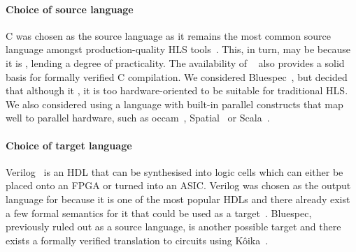 \paragraph{Choice of source language}
C was chosen as the source language as it remains the most common source
language amongst production-quality HLS tools~\cite{canis13_l,
  amd23_vitis_high_synth, intel20_hsc, pilato13_bambu}. This, in turn, may be
because it is , lending a
degree of practicality.  The availability of
\compcert{}~\cite{leroy09_formal_verif_realis_compil} also provides a solid
basis for formally verified C compilation.
We considered Bluespec~\cite{nikhil04_bsv}, but decided that although it
, it is too hardware-oriented to be suitable for traditional HLS.  We
also considered using a language with built-in parallel constructs that map well
to parallel hardware, such as occam~\cite{page91_compil_occam},
Spatial~\cite{koeplinger18_s} or Scala~\cite{bachrach12_chisel}.


\paragraph{Choice of target language}
Verilog~\cite{06_ieee_stand_veril_hardw_descr_languag} is an \gls{HDL} that can
be synthesised into logic cells which can either be placed onto an \gls{FPGA} or
turned into an \gls{ASIC}.  Verilog was chosen as the output language for
\vericert{} because it is one of the most popular HDLs and there already exist a
few formal semantics for it that could be used as a
target~\cite{lööw19_verif_compil_verif_proces, meredith10_veril}.  Bluespec,
previously ruled out as a source language, is another possible target and there
exists a formally verified translation to circuits using
K\^{o}ika~\cite{bourgeat20_essen_blues}. %

